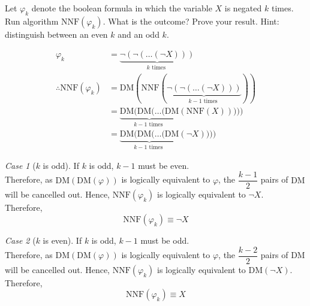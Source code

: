 \documentclass[fleqn, a4paper, 12pt, oneside]{amsart}
\theoremstyle{definition}
\theoremstyle{theorem}
\theoremstyle{remark}
\newtheorem{case}{Case}
\newcommand{\NOT}{\neg}
\begin{document}
\begin{question}
	Let $\varphi_k$ denote the boolean formula in which the variable $X$ is negated $k$ times. Run algorithm $\mathrm{NNF}(\varphi_k)$.
	What is the outcome?
	Prove your result.
	Hint: distinguish between an even $k$ and an odd $k$.
\end{question}

\begin{solution}
	\begin{align*}
		\varphi_k &= \underbrace{\NOT(\NOT(\dots(\NOT X)))}_{k \text{ times }}\\
		\therefore \mathrm{NNF}(\varphi_k) &= \mathrm{DM}(\mathrm{NNF}(\underbrace{\NOT(\NOT(\dots(\NOT X)))}_{k - 1 \text{ times }}))\\
		&= \underbrace{\mathrm{DM}(\mathrm{DM}(\dots(\mathrm{DM}}_{k - 1 \text{ times }}(\mathrm{NNF}(X)))))\\
		&= \underbrace{\mathrm{DM}(\mathrm{DM}(\dots(\mathrm{DM}}_{k - 1 \text{ times }}(\NOT X))))
	\end{align*}
	\begin{case}[$k$ is odd]
		If $k$ is odd, $k - 1$ must be even.\\
		Therefore, as $\mathrm{DM}(\mathrm{DM}(\varphi))$ is logically equivalent to $\varphi$, the $\dfrac{k - 1}{2}$ pairs of $\mathrm{DM}$ will be cancelled out.
		Hence, $\mathrm{NNF}(\varphi_k)$ is logically equivalent to $\NOT X$.\\
		Therefore,
		\begin{equation*}
			\mathrm{NNF}(\varphi_k) \equiv \NOT X
		\end{equation*}
	\end{case}
	\begin{case}[$k$ is even]
		If $k$ is odd, $k - 1$ must be odd.\\
		Therefore, as $\mathrm{DM}(\mathrm{DM}(\varphi))$ is logically equivalent to $\varphi$, the $\dfrac{k - 2}{2}$ pairs of $\mathrm{DM}$ will be cancelled out.
		Hence, $\mathrm{NNF}(\varphi_k)$ is logically equivalent to $\mathrm{DM}(\NOT X)$.\\
		Therefore,
		\begin{equation*}
			\mathrm{NNF}(\varphi_k) \equiv X
		\end{equation*}
	\end{case}
\end{solution}
\end{document}
